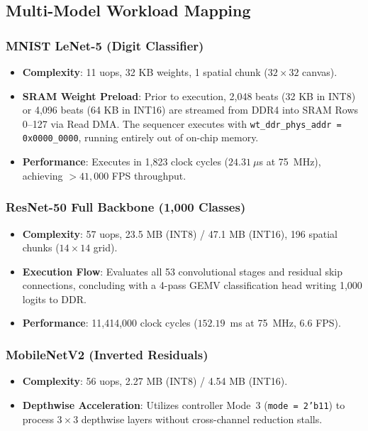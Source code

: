 \documentclass[10pt,journal,compsoc]{IEEEtran}
\begin{document}
\subsection{Multi-Model Workload Mapping}

\subsubsection{MNIST LeNet-5 (Digit Classifier)}
\begin{itemize}
    \item \textbf{Complexity}: 11 uops, 32 KB weights, 1 spatial chunk ($32\times32$ canvas).
    \item \textbf{SRAM Weight Preload}: Prior to execution, 2,048 beats (32 KB in INT8) or 4,096 beats (64 KB in INT16) are streamed from DDR4 into SRAM Rows 0--127 via Read DMA. The sequencer executes with \texttt{wt\_ddr\_phys\_addr = 0x0000\_0000}, running entirely out of on-chip memory.
    \item \textbf{Performance}: Executes in 1,823 clock cycles ($24.31~\mu$s at 75~MHz), achieving $> 41,000$ FPS throughput.
\end{itemize}

\subsubsection{ResNet-50 Full Backbone (1,000 Classes)}
\begin{itemize}
    \item \textbf{Complexity}: 57 uops, 23.5 MB (INT8) / 47.1 MB (INT16), 196 spatial chunks ($14\times14$ grid).
    \item \textbf{Execution Flow}: Evaluates all 53 convolutional stages and residual skip connections, concluding with a 4-pass GEMV classification head writing 1,000 logits to DDR.
    \item \textbf{Performance}: 11,414,000 clock cycles ($152.19$~ms at 75~MHz, 6.6 FPS).
\end{itemize}

\subsubsection{MobileNetV2 (Inverted Residuals)}
\begin{itemize}
    \item \textbf{Complexity}: 56 uops, 2.27 MB (INT8) / 4.54 MB (INT16).
    \item \textbf{Depthwise Acceleration}: Utilizes controller Mode~3 (\texttt{mode = 2'b11}) to process $3\times3$ depthwise layers without cross-channel reduction stalls.
\end{itemize}
\end{document}
